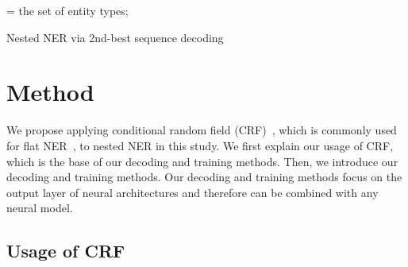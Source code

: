\documentclass[11pt,a4paper]{article}
\begin{document}
\begin{algorithm*}[t]
\small
{}
 = the set of entity types;\\
\caption{Nested NER via 2nd-best sequence decoding}\label{alg:pseudo-code}
\end{algorithm*}

\section{Method}

We propose applying conditional random field (CRF)~\cite{lafferty2001}, which is commonly used for flat NER~\cite{lample-etal-2016-neural,ma-hovy-2016-end,chiu-nichols-2016-named,reimers-gurevych-2017-reporting,strubell-etal-2017-fast,akbik-etal-2018-contextual}, to nested NER in this study.
We first explain our usage of CRF, which is the base of our decoding and training methods.
Then, we introduce our decoding and training methods.
Our decoding and training methods focus on the output layer of neural architectures and therefore can be combined with any neural model.

\subsection{Usage of CRF}
\label{ssec:usage}
\end{document}
